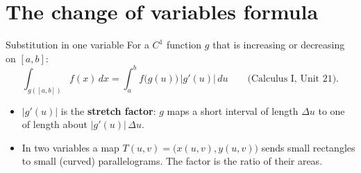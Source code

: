 \documentclass[10pt]{wosm-slides}
\begin{document}
\section{The change of variables formula}

\begin{frame}{Substitution in one variable}
  For a $C^1$ function $g$ that is increasing or decreasing on $[a, b]$:
  \[ \int_{g([a, b])} f(x)\, dx = \int_a^b f\bigl(g(u)\bigr)\, |g'(u)|\, du \qquad \text{(Calculus I, Unit 21).} \]
  \pause
  \begin{itemize}
    \item $|g'(u)|$ is the \textbf{stretch factor}: $g$ maps a short interval of length $\Delta u$ to one of
      length about $|g'(u)|\, \Delta u$.
    \item In two variables a map $T(u, v) = \bigl(x(u, v), y(u, v)\bigr)$ sends small rectangles to small
      (curved) parallelograms. The factor is the ratio of their areas.
  \end{itemize}
\end{frame}
\end{document}
